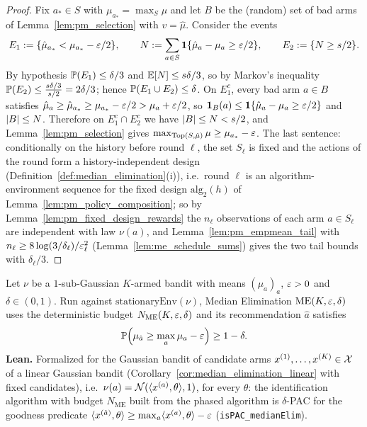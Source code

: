 \begin{proof}
\leanok
{}
Fix $a_*\in S$ with $\mu_{a_*} = \max_S\mu$ and let $B$ be the (random) set of bad arms of
Lemma~\ref{lem:pm_selection} with $v = \hat\mu$. Consider the events
\[
  E_1 := \{\hat\mu_{a_*}<\mu_{a_*}-\varepsilon/2\},\qquad
  N := \sum_{a\in S}\mathbf{1}\{\hat\mu_a-\mu_a\ge\varepsilon/2\},\qquad E_2 := \{N\ge s/2\}.
\]
By hypothesis $\mathbb{P}(E_1)\le\delta/3$ and $\mathbb{E}[N]\le s\delta/3$, so by Markov's inequality
$\mathbb{P}(E_2)\le\frac{s\delta/3}{s/2} = 2\delta/3$; hence $\mathbb{P}(E_1\cup E_2)\le\delta$. On
$E_1^c$, every bad arm $a\in B$ satisfies $\hat\mu_a\ge\hat\mu_{a_*}\ge\mu_{a_*}-\varepsilon/2>\mu_a+\varepsilon/2$,
so $\mathbf{1}_B(a)\le\mathbf{1}\{\hat\mu_a-\mu_a\ge\varepsilon/2\}$ and $\lvert B \rvert\le N$. Therefore on
$E_1^c\cap E_2^c$ we have $\lvert B \rvert\le N<s/2$, and Lemma~\ref{lem:pm_selection} gives
$\max_{\mathrm{Top}(S,\hat\mu)}\mu\ge\mu_{a_*}-\varepsilon$. The last sentence: conditionally on the
history before round $\ell$, the set $S_\ell$ is fixed and the actions of the round form a
history-independent design (Definition~\ref{def:median_elimination}(i)), i.e.\ round $\ell$ is
an algorithm-environment sequence for the fixed design $\mathrm{alg}_2(h)$ of
Lemma~\ref{lem:pm_policy_composition}; so by
Lemma~\ref{lem:pm_fixed_design_rewards} the $n_\ell$ observations of each arm $a\in S_\ell$ are
independent with law $\nu(a)$, and Lemma~\ref{lem:pm_empmean_tail} with
$n_\ell\ge8\log(3/\delta_\ell)/\varepsilon_\ell^2$ (Lemma~\ref{lem:me_schedule_sums}) gives the two tail
bounds with $\delta_\ell/3$.
\end{proof}

\begin{theorem}\label{thm:median_elimination}
\leanok
{}
Let $\nu$ be a $1$-sub-Gaussian $K$-armed bandit with means $(\mu_a)_a$, $\varepsilon>0$ and
$\delta\in(0,1)$. Run against $\mathrm{stationaryEnv}(\nu)$, Median Elimination
$\mathrm{ME}(K,\varepsilon,\delta)$ uses the deterministic budget $N_{\mathrm{ME}}(K,\varepsilon,\delta)$ and
its recommendation $\hat a$ satisfies
\[
  \mathbb{P}\Big(\mu_{\hat a}\ge\max_{a}\mu_a-\varepsilon\Big)\ge1-\delta .
\]
\textbf{Lean.} Formalized for the Gaussian bandit of candidate arms $x^{(1)},\dots,x^{(K)}\in\mathcal{X}$ of
a linear Gaussian bandit (Corollary~\ref{cor:median_elimination_linear} with fixed candidates),
i.e.\ $\nu(a) = \mathcal{N}(\langle x^{(a)}, \theta \rangle, 1)$, for every $\theta$: the identification
algorithm with budget $N_{\mathrm{ME}}$ built from the phased algorithm is
$\delta$-PAC for the goodness predicate
$\langle x^{(\hat a)}, \theta \rangle\ge\max_a\langle x^{(a)}, \theta \rangle-\varepsilon$ (\texttt{isPAC\_medianElim}).
\end{theorem}

